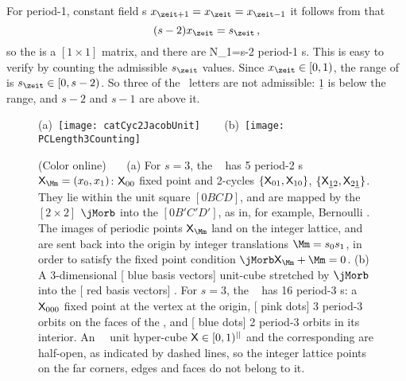 For period-1, constant field  {\lattstate}s
$\ssp_{\zeit+1}=\ssp_{\zeit}=\ssp_{\zeit-1}$
it follows from
 that
\[
        ({s}-2)\ssp_\zeit = \Ssym{\zeit}
\,,
\]
so the {\jacobianOrb} is a $[1\times1]$ matrix, and there are
\beq
N_1={s}-2
period-1 {\lattstate}s. This is easy to verify by counting the admissible
$\Ssym{\zeit}$ values. Since $\ssp_\zeit \in [0,1)$, the range of
\Ssym{\zeit} is $\Ssym{\zeit} \in [0,s-2)$. So three of the
  \templatt\  letters are not admissible:
$\underline{1}$ is below the range, and $s-2$ and $s-1$ are above it.

\begin{figure}
  \centering
(a)~\texttt{[image: catCyc2JacobUnit]}
~~~
(b)~\texttt{[image: PCLength3Counting]}
  \caption{\label{fig:catCycJacob}
    (Color online)~~~
(a)
    For $s=3$, the \templatt\  has 5 period-2
    {\lattstate}s $\Xx_\Mm=(\ssp_0,\ssp_1)$: $\mathsf{X}_{00}$ fixed point and
    2-cycles $\{\mathsf{X}_{01},\mathsf{X}_{10}\}$,
    $\{\mathsf{X}_{\underline{1}2},\mathsf{X}_{2\underline{1}}\}$. They lie
    within the unit square $[0BCD]$, and are mapped by the
    $[2\!\times\!2]$ {\jacobianOrb} $\jMorb$  into the
    {\fundPip} $[0B'C'D']$, as in, for example, Bernoulli
    . The images of periodic points $\Xx_\Mm$
    land on the integer lattice, and are sent back into the origin by
    integer translations $\Mm= \Ssym{0}\Ssym{1}$, in order to satisfy the
    fixed point condition
    $\jMorb\Xx_\Mm+\Mm=0$.
(b) A 3-dimensional [{\color{blue} blue} basis vectors] unit-cube stretched by
    $\jMorb$  into the [{\color{red} red} basis vectors]
    {\fundPip}. For $s=3$, the \templatt\
     has 16 period-3 {\lattstate}s: a $\mathsf{X}_{000}$
    fixed point at the vertex at the origin, [{\color{red} pink dots}] 3
    period-3 orbits on the faces of the {\fundPip}, and
    [{\color{blue} blue dots}] 2 period-3 orbits in its interior.
    An \cl{}\dmn\ \statesp\ unit hyper-cube $\mathsf{X}\in[0,1)^{||}$ and the
    corresponding {\fundPip} are half-open, as indicated
    by dashed lines, so the integer lattice points on the far corners, edges
    and faces do not belong to it.
}
\end{figure}

